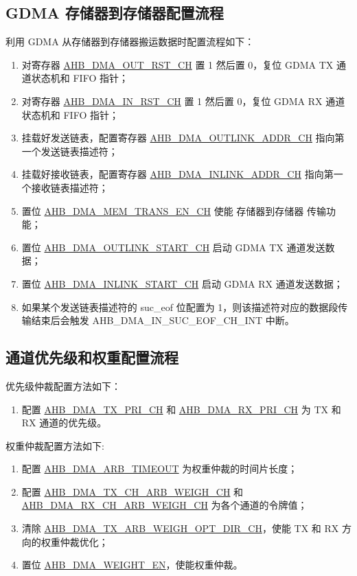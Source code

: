 \documentclass[main\_\_CN.tex]{subfiles}
\begin{document}
\subsection{GDMA 存储器到存储器配置流程}
利用 GDMA 从存储器到存储器搬运数据时配置流程如下：
\begin{enumerate}
    \item 对寄存器 \hyperref[fielddesc:AHBDMAOUTRSTCHN]{AHB\_DMA\_OUT\_RST\_CH} 置 1 然后置 0，复位 GDMA TX 通道状态机和 FIFO 指针；
    \item 对寄存器 \hyperref[fielddesc:AHBDMAINRSTCHN]{AHB\_DMA\_IN\_RST\_CH} 置 1 然后置 0，复位 GDMA RX 通道状态机和 FIFO 指针；
    \item 挂载好发送链表，配置寄存器 \hyperref[fielddesc:AHBDMAOUTLINKADDRCHN]{AHB\_DMA\_OUTLINK\_ADDR\_CH} 指向第一个发送链表描述符；
    \item 挂载好接收链表，配置寄存器 \hyperref[fielddesc:AHBDMAINLINKADDRCHN]{AHB\_DMA\_INLINK\_ADDR\_CH} 指向第一个接收链表描述符；
    \item 置位 \hyperref[fielddesc:AHBDMAMEMTRANSENCHN]{AHB\_DMA\_MEM\_TRANS\_EN\_CH} 使能 存储器到存储器 传输功能；
    \item 置位 \hyperref[fielddesc:AHBDMAOUTLINKSTARTCHN]{AHB\_DMA\_OUTLINK\_START\_CH} 启动 GDMA TX 通道发送数据；
    \item 置位 \hyperref[fielddesc:AHBDMAINLINKSTARTCHN]{AHB\_DMA\_INLINK\_START\_CH} 启动 GDMA RX 通道发送数据；
    \item 如果某个发送链表描述符的 suc\_eof 位配置为 1，则该描述符对应的数据段传输结束后会触发 AHB\_DMA\_IN\_SUC\_EOF\_CH\_INT 中断。
\end{enumerate}

\subsection{通道优先级和权重配置流程}

优先级仲裁配置方法如下：
\begin{enumerate}
\item  配置 \hyperref[fielddesc:AHBDMATXPRICHN]{AHB\_DMA\_TX\_PRI\_CH} 和 \hyperref[fielddesc:AHBDMARXPRICHN]{AHB\_DMA\_RX\_PRI\_CH} 为 TX 和 RX 通道的优先级。
\end{enumerate}

权重仲裁配置方法如下:
\begin{enumerate}
\item 配置 \hyperref[fielddesc:AHBDMAARBTIMEOUT]{AHB\_DMA\_ARB\_TIMEOUT} 为权重仲裁的时间片长度；
\item 配置 \hyperref[fielddesc:AHBDMATXCHARBWEIGHCHN]{AHB\_DMA\_TX\_CH\_ARB\_WEIGH\_CH} 和 \hyperref[fielddesc:AHBDMARXCHARBWEIGHCHN]{AHB\_DMA\_RX\_CH\_ARB\_WEIGH\_CH} 为各个通道的令牌值；
\item 清除 \hyperref[fielddesc:AHBDMATXARBWEIGHOPTDIRCHN]{AHB\_DMA\_TX\_ARB\_WEIGH\_OPT\_DIR\_CH}，使能 TX 和 RX 方向的权重仲裁优化；
\item 置位 \hyperref[fielddesc:AHBDMAWEIGHTEN]{AHB\_DMA\_WEIGHT\_EN}，使能权重仲裁。
\end{enumerate}
\end{document}
